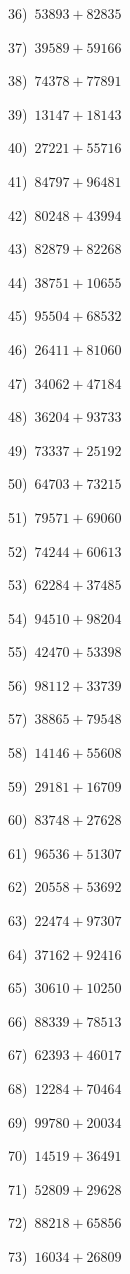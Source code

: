\documentclass{article}
\begin{document}
\begin{multicols}{2}
36)$\,\,\,53893+82835$ \par 
37)$\,\,\,39589+59166$ \par 
38)$\,\,\,74378+77891$ \par 
39)$\,\,\,13147+18143$ \par 
40)$\,\,\,27221+55716$ \par 
41)$\,\,\,84797+96481$ \par 
42)$\,\,\,80248+43994$ \par 
43)$\,\,\,82879+82268$ \par 
44)$\,\,\,38751+10655$ \par 
45)$\,\,\,95504+68532$ \par 
46)$\,\,\,26411+81060$ \par 
47)$\,\,\,34062+47184$ \par 
48)$\,\,\,36204+93733$ \par 
49)$\,\,\,73337+25192$ \par 
50)$\,\,\,64703+73215$ \par 
51)$\,\,\,79571+69060$ \par 
52)$\,\,\,74244+60613$ \par 
53)$\,\,\,62284+37485$ \par 
54)$\,\,\,94510+98204$ \par 
55)$\,\,\,42470+53398$ \par 
56)$\,\,\,98112+33739$ \par 
57)$\,\,\,38865+79548$ \par 
58)$\,\,\,14146+55608$ \par 
59)$\,\,\,29181+16709$ \par 
60)$\,\,\,83748+27628$ \par 
61)$\,\,\,96536+51307$ \par 
62)$\,\,\,20558+53692$ \par 
63)$\,\,\,22474+97307$ \par 
64)$\,\,\,37162+92416$ \par 
65)$\,\,\,30610+10250$ \par 
66)$\,\,\,88339+78513$ \par 
67)$\,\,\,62393+46017$ \par 
68)$\,\,\,12284+70464$ \par 
69)$\,\,\,99780+20034$ \par 
70)$\,\,\,14519+36491$ \par 
71)$\,\,\,52809+29628$ \par 
72)$\,\,\,88218+65856$ \par 
73)$\,\,\,16034+26809$ \par 

\end{multicols}
\end{document}
